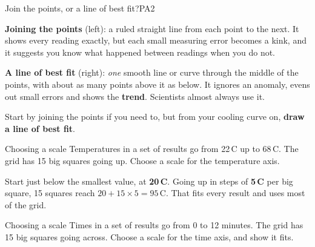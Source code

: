 \begin{technique}{Join the points, or a line of best fit?}{PA2}
\begin{minipage}[c]{0.56\linewidth}
\textbf{Joining the points} (left): a ruled straight line from each point to the next. It shows every reading exactly, but each small measuring error becomes a kink, and it suggests you know what happened between readings when you do not.

\smallskip
\textbf{A line of best fit} (right): \emph{one} smooth line or curve through the middle of the points, with about as many points above it as below. It ignores an anomaly, evens out small errors and shows the \textbf{trend}. Scientists almost always use it.

\smallskip
Start by joining the points if you need to, but from your cooling curve on, \textbf{draw a line of best fit}.
\end{minipage}\hfill
\begin{minipage}[c]{0.4\linewidth}\centering
{}
\end{minipage}
\end{technique}

\begin{workedex}{Choosing a scale}
Temperatures in a set of results go from 22\,\textdegree C up to 68\,\textdegree C. The grid has 15 big squares going up. Choose a scale for the temperature axis.

\medskip
Start just below the smallest value, at \textbf{20\,\textdegree C}. Going up in steps of \textbf{5\,\textdegree C} per big square, 15 squares reach $20 + 15 \times 5 = 95$\,\textdegree C. That fits every result and uses most of the grid.
\end{workedex}

\begin{wedo}{Choosing a scale}
Times in a set of results go from 0 to 12 minutes. The grid has 15 big squares going across. Choose a scale for the time axis, and show it fits.
\workbox{3cm}
\end{wedo}

